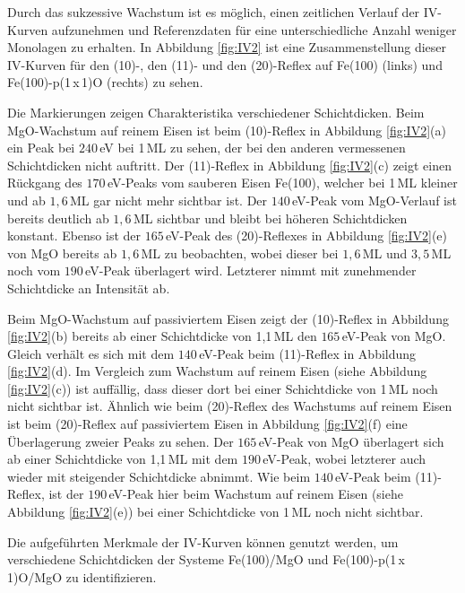 Durch das sukzessive Wachstum ist es möglich, einen zeitlichen Verlauf der IV-Kurven aufzunehmen und Referenzdaten
für eine unterschiedliche Anzahl weniger Monolagen zu erhalten. In Abbildung \ref{fig:IV2} ist eine Zusammenstellung 
dieser IV-Kurven für den (10)-, den (11)- und den (20)-Reflex auf Fe(100) (links) und Fe(100)-p(1\,x\,1)O (rechts) zu sehen.


Die Markierungen zeigen Charakteristika verschiedener Schichtdicken.
Beim MgO-Wachstum auf reinem Eisen ist beim (10)-Reflex in Abbildung \ref{fig:IV2}(a) ein Peak 
bei $240$\,eV bei 1\,ML zu sehen, der bei den anderen vermessenen Schichtdicken nicht auftritt.\newline
Der (11)-Reflex in Abbildung \ref{fig:IV2}(c) zeigt einen Rückgang des $170$\,eV-Peaks vom sauberen Eisen Fe(100), welcher bei 1\,ML kleiner und ab $1,6$\,ML gar nicht mehr sichtbar ist.
Der $140$\,eV-Peak vom MgO-Verlauf ist bereits deutlich ab $1,6$\,ML sichtbar und bleibt bei höheren Schichtdicken konstant.\newline
Ebenso ist der $165$\,eV-Peak des (20)-Reflexes in Abbildung \ref{fig:IV2}(e) von MgO bereits ab $1,6$\,ML zu beobachten, wobei dieser 
bei $1,6$\,ML und $3,5$\,ML noch vom $190$\,eV-Peak überlagert wird. Letzterer nimmt mit zunehmender Schichtdicke an Intensität ab.

Beim MgO-Wachstum auf passiviertem Eisen zeigt der (10)-Reflex in Abbildung \ref{fig:IV2}(b) bereits ab einer Schichtdicke von 1,1\,ML den 
$165$\,eV-Peak von MgO.\newline 
Gleich verhält es sich mit dem $140$\,eV-Peak beim (11)-Reflex in Abbildung \ref{fig:IV2}(d).
Im Vergleich zum Wachstum auf reinem Eisen (siehe Abbildung \ref{fig:IV2}(c)) ist auffällig, dass dieser dort bei einer Schichtdicke von 1\,ML 
noch nicht sichtbar ist.\newline
Ähnlich wie beim (20)-Reflex des Wachstums auf reinem Eisen ist beim (20)-Reflex auf passiviertem Eisen in Abbildung \ref{fig:IV2}(f)
eine Überlagerung zweier Peaks zu sehen. Der $165$\,eV-Peak von MgO überlagert sich ab einer Schichtdicke von 1,1\,ML
mit dem $190$\,eV-Peak, wobei letzterer auch wieder mit steigender Schichtdicke abnimmt.
Wie beim $140$\,eV-Peak beim (11)-Reflex, ist der $190$\,eV-Peak hier beim Wachstum auf reinem Eisen (siehe Abbildung \ref{fig:IV2}(e)) bei einer Schichtdicke von
1\,ML noch nicht sichtbar.

Die aufgeführten Merkmale der IV-Kurven können genutzt werden, um verschiedene Schichtdicken der 
Systeme Fe(100)/MgO und Fe(100)-p(1\,x\,1)O/MgO zu identifizieren.



